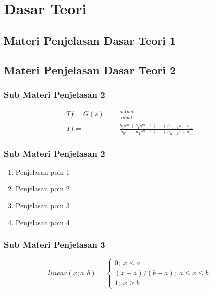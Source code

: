 \section{Dasar Teori}

\subsection{Materi Penjelasan Dasar Teori 1}
\lipsum[1]

\subsection{Materi Penjelasan Dasar Teori 2}
\subsubsection{Sub Materi Penjelasan 2}
\lipsum[1]

\begin{equation}
	\label{eq tforigin}
	\begin{split}
		Tf = G(s) = & \frac{output}{input} \\
		Tf= & \frac{b_{0}s^{m} + b_{1}s^{m-1} + ... + b_{m-1}s + b_{m}}{a_{0}s^{n} + a_{1}s^{n-1} + ... + a_{n-1}s + a_{n}}
	\end{split}
\end{equation}

\lipsum[1]

\subsubsection{Sub Materi Penjelasan 2}
\lipsum[1]
\begin{enumerate}
    \item Penjelasan poin 1
    \item Penjelasan poin 2
    \item Penjelasan poin 3
    \item Penjelasan poin 4
\end{enumerate}

\subsubsection{Sub Materi Penjelasan 3}
\lipsum[1]

\begin{equation}
	\label{eq liniernaik}
	linear(x; a,b) =
	\left\{\begin{matrix}
		0; \; x \leq a\\ 
		(x-a)/(b-a); \; a \leq x \leq b\\ 
		1; \; x \geq b
	\end{matrix}\right.
\end{equation}

\lipsum[1]